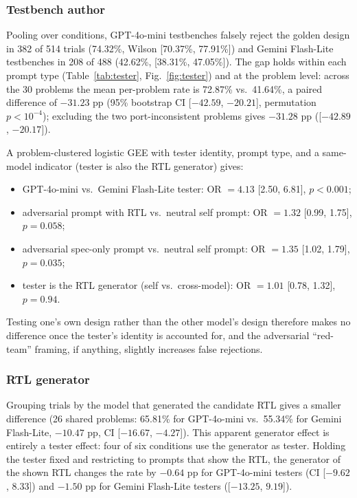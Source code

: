 \documentclass[conference]{IEEEtran}
\begin{document}
\subsubsection{Testbench author}
Pooling over conditions, GPT-4o-mini testbenches falsely reject the golden design in 382 of 514 trials (74.32\%, Wilson [70.37\%, 77.91\%]) and Gemini Flash-Lite testbenches in 208 of 488 (42.62\%, [38.31\%, 47.05\%]). The gap holds within each prompt type (Table~\ref{tab:tester}, Fig.~\ref{fig:tester}) and at the problem level: across the 30 problems the mean per-problem rate is 72.87\% vs.\ 41.64\%, a paired difference of $-31.23$ pp (95\% bootstrap CI [$-42.59$, $-20.21$], permutation $p < 10^{-4}$); excluding the two port-inconsistent problems gives $-31.28$ pp ([$-42.89$, $-20.17$]).

A problem-clustered logistic GEE with tester identity, prompt type, and a same-model indicator (tester is also the RTL generator) gives:
\begin{itemize}
    \item GPT-4o-mini vs.\ Gemini Flash-Lite tester: OR $= 4.13$ [2.50, 6.81], $p < 0.001$;
    \item adversarial prompt with RTL vs.\ neutral self prompt: OR $= 1.32$ [0.99, 1.75], $p = 0.058$;
    \item adversarial spec-only prompt vs.\ neutral self prompt: OR $= 1.35$ [1.02, 1.79], $p = 0.035$;
    \item tester is the RTL generator (self vs.\ cross-model): OR $= 1.01$ [0.78, 1.32], $p = 0.94$.
\end{itemize}
Testing one's own design rather than the other model's design therefore makes no difference once the tester's identity is accounted for, and the adversarial ``red-team'' framing, if anything, slightly increases false rejections.

\subsubsection{RTL generator}
Grouping trials by the model that generated the candidate RTL gives a smaller difference (26 shared problems: 65.81\% for GPT-4o-mini vs.\ 55.34\% for Gemini Flash-Lite, $-10.47$ pp, CI [$-16.67$, $-4.27$]). This apparent generator effect is entirely a tester effect: four of six conditions use the generator as tester. Holding the tester fixed and restricting to prompts that show the RTL, the generator of the shown RTL changes the rate by $-0.64$ pp for GPT-4o-mini testers (CI [$-9.62$, $8.33$]) and $-1.50$ pp for Gemini Flash-Lite testers ([$-13.25$, $9.19$]).
\end{document}
